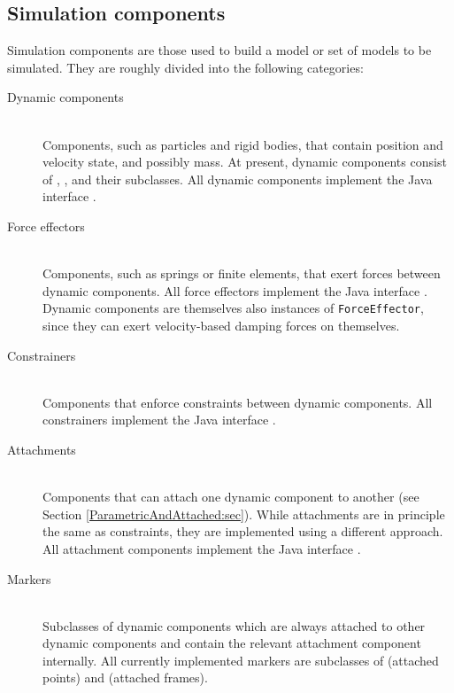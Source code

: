 \subsection{Simulation components}
\label{SimulationComponents:sec}

Simulation components are those used to build a model or set of models to be
simulated. They are roughly divided into the following categories:

\begin{description}

\item[Dynamic components] \mbox{}\hfill\\ Components, such as
particles and rigid bodies, that contain position and velocity state, and
possibly mass. At present, dynamic components consist of
, , 
and their subclasses. All dynamic components implement the Java interface
.

\item[Force effectors] \mbox{}\hfill\\
Components, such as springs or finite elements,
that exert forces between dynamic components.
All force effectors implement the Java interface
.
Dynamic components are themselves also instances of {\tt ForceEffector}, since
they can exert velocity-based damping forces on themselves.

\item[Constrainers] \mbox{}\hfill\\
Components that enforce constraints between dynamic components. 
All constrainers implement the Java interface
.

\item[Attachments] \mbox{}\hfill\\
Components that can attach one dynamic component to another (see
Section \ref{ParametricAndAttached:sec}). While attachments are in principle the
same as constraints, they are implemented using a
different approach.  All attachment components
implement the Java interface 
.

\item[Markers] \mbox{}\hfill\\
Subclasses of dynamic components which are always attached to other dynamic
components and contain the relevant attachment component internally.  All
currently implemented markers are subclasses of
 (attached points) and
 (attached frames).


\end{description}
